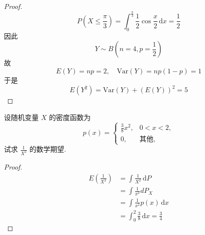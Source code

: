 \documentclass[../main.tex]{subfiles}
\begin{document}
\begin{proof}
  \[
    P\left( X\le \frac{ \pi  }{3 }  \right)= \int_{0}^{\frac{ \pi  }{3 } }\frac{1 }{2 }\cos \frac{x }{2 }\,\mathrm{d} x=   \frac{1 }{2 } 
    \]因此 \[
    Y\sim B\left( n = 4, p= \frac{1 }{2 }  \right) 
    \] 故 \[
    E\left( Y \right)= np= 2,\quad \mathrm{Var}\left( Y \right)= np\left( 1-p \right)= 1   
    \]于是 \[
    E\left( Y^{2} \right)=  \mathrm{Var}\left( Y \right)+  \left( E\left( Y \right)  \right)^{2}   = 5
    \]
\end{proof}
\begin{exercise}{}{}
    设随机变量 $X$ 的密度函数为
$$p(x) = \begin{cases} \frac{3}{8}x^2, & 0 < x < 2, \\ 0, & \text{其他}, \end{cases}$$
试求 $\frac{1}{X^2}$ 的数学期望.
\end{exercise}

\begin{proof}
    \[
    \begin{aligned}
      E\left( \frac{1 }{X^{2} }  \right)&= \int \frac{1 }{X^{2} }\,\mathrm{d} P \\ 
       &= \int \frac{1 }{x^{2} } d P_{X}\\ 
        &= \int \frac{1 }{x^{2} }p\left( x \right)\,\mathrm{d} x \\ 
         &= \int_{0}^{2}\frac{3 }{8 }\,\mathrm{d} x= \frac{3 }{4 }    
    \end{aligned}  
      \]
\end{proof}
\end{document}

